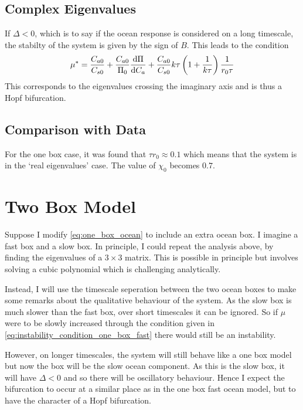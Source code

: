 \subsection{Complex Eigenvalues}
If $\Delta < 0$, which is to say if the ocean response is considered on a long timescale, the stabilty of the system is given by the sign of $B$.
This leads to the condition
\begin{equation}
  \label{eq:instability_condition_one_box_slow}
  \mu^* =\frac{C_{a0}}{C_{s0}} + \frac{C_{a0}}{\Pi_0} \dv{\Pi}{C_a} + \frac{C_{a0}}{C_{s0}} k\tau\left(
     1 + \frac{1}{k\tau}
  \right) \frac{1}{r_0\tau}
\end{equation}
This corresponds to the eigenvalues crossing the imaginary axis and is thus a Hopf bifurcation.

\subsection{Comparison with Data}
For the one box case, it was found that $\tau r_0 \approx 0.1$ which means that the system is in the `real eigenvalues' case. The value of $\chi_0$ becomes
$0.7$.


\section{Two Box Model}
Suppose I modify \cref{eq:one_box_ocean} to include an extra ocean box. I imagine a fast box and a slow box. In principle, I could repeat the
analysis above, by finding the eigenvalues of a $3 \times 3$ matrix. This is possible in principle but involves solving a cubic polynomial which
is challenging analytically.

Instead, I will use the timescale seperation between the two ocean boxes to make some remarks about the qualitative behaviour of the system.
As the slow box is much slower than the fast box, over short timescales it can be ignored. So if $\mu$ were to be slowly increased through
the condition given in \cref{eq:instability_condition_one_box_fast} there would still be an instability.

However, on longer timescales, the system will still behave like a one box model but now the box will be the slow ocean component. As this is the slow box,
it will have $\Delta < 0$ and so there will be oscillatory behaviour. Hence I expect the bifurcation to occur at a similar place as in the one box fast ocean model,
but to have the character of a Hopf bifurcation.

